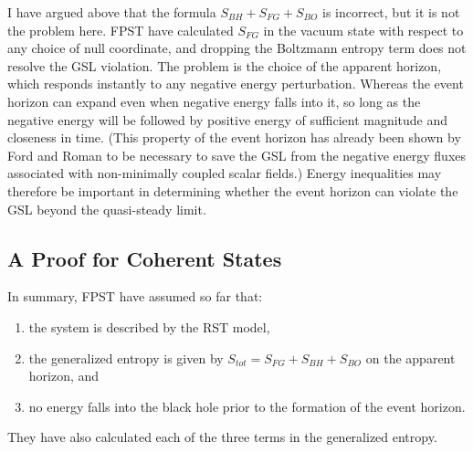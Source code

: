 \documentclass{article}
\begin{document}
I have argued above that the formula $S_{BH} + S_{FG} + S_{BO}$ is incorrect, but it is not the problem here.  FPST have calculated $S_{FG}$ in the vacuum state with respect to any choice of null coordinate, and dropping the Boltzmann entropy term does not resolve the GSL violation.  The problem is the choice of the apparent horizon, which responds instantly to any negative energy perturbation.  Whereas the event horizon can expand even when negative energy falls into it, so long as the negative energy will be followed by positive energy of sufficient magnitude and closeness in time.  (This property of the event horizon has already been shown by Ford and Roman \cite{FR01} to be necessary to save the GSL from the negative energy fluxes associated with non-minimally coupled scalar fields.)  Energy inequalities may therefore be important in determining whether the event horizon can violate the GSL beyond the quasi-steady limit.

\subsection{A Proof for Coherent States}

In summary, FPST have assumed so far that:
\begin{enumerate}
\item the system is described by the RST model,
\item the generalized entropy is given by $S_{tot} = S_{FG} + S_{BH} + S_{BO}$ on the apparent horizon, and
\item no energy falls into the black hole prior to the formation of the event horizon.
\end{enumerate}
They have also calculated each of the three terms in the generalized entropy.
\end{document}
